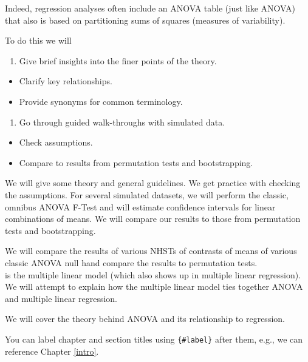 \documentclass[
]{book}
\providecommand{\tightlist}{%
  \setlength{\itemsep}{0pt}\setlength{\parskip}{0pt}}
\begin{document}
Indeed, regression analyses often include an ANOVA table (just like ANOVA) that also is based on partitioning sums of squares (measures of variability).

To do this we will

\begin{enumerate}
\def\labelenumi{\arabic{enumi}.}
\tightlist
\item
  Give brief insights into the finer points of the theory.\\
\end{enumerate}

\begin{itemize}
\tightlist
\item
  Clarify key relationships.\\
\item
  Provide synonyms for common terminology.
\end{itemize}

\begin{enumerate}
\def\labelenumi{\arabic{enumi}.}
\setcounter{enumi}{1}
\tightlist
\item
  Go through guided walk-throughs with simulated data.\\
\end{enumerate}

\begin{itemize}
\tightlist
\item
  Check assumptions.
\item
  Compare to results from permutation tests and bootstrapping.
\end{itemize}

We will give some theory and general guidelines.
We get practice with checking the assumptions.
For several simulated datasets, we will perform the classic, omnibus ANOVA F-Test and will estimate confidence intervals for linear combinations of means. We will compare our results to those from permutation tests and bootstrapping.

We will compare the results of various NHSTs of contrasts of means of various classic ANOVA null hand compare the results to permutation tests.\\
is the multiple linear model (which also shows up in multiple linear regression). We will attempt to explain how the multiple linear model ties together ANOVA and multiple linear regression.

We will cover the theory behind ANOVA and its relationship to regression.

You can label chapter and section titles using \texttt{\{\#label\}} after them, e.g., we can reference Chapter \ref{intro}.
\end{document}
